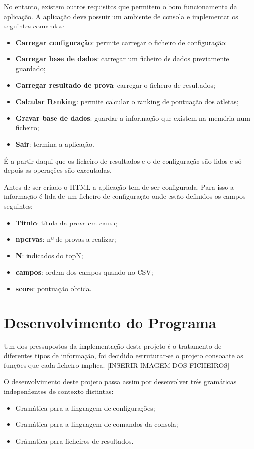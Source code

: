 \documentclass[11pt, a4paper, oneside]{article}
\begin{document}
No entanto, existem outros requisitos que permitem o bom funcionamento da aplicação. A aplicação deve possuir um ambiente de consola e implementar os seguintes comandos:
\begin{itemize}
\item \textbf{Carregar configuração}: permite carregar o ficheiro de configuração;
\item \textbf{Carregar base de dados}: carregar um ficheiro de dados previamente guardado;
\item \textbf{Carregar resultado de prova}: carregar o ficheiro de resultados;
\item \textbf{Calcular Ranking}: permite calcular o ranking de pontuação dos atletas;
\item \textbf{Gravar base de dados}: guardar a informação que existem na memória num ficheiro;
\item \textbf{Sair}: termina a aplicação.
\end{itemize}

É a partir daqui que os ficheiro de resultados e o de configuração são lidos e só depois as operações são executadas. 

Antes de ser criado o HTML a aplicação tem de ser configurada. Para isso a informação é lida de um ficheiro de configuração onde estão definidos os campos seguintes:
\begin{itemize}
\item \textbf{Titulo}: título da prova em causa;
\item \textbf{nporvas}: nº de provas a realizar;
\item \textbf{N}: indicados do topN;
\item \textbf{campos}: ordem dos campos quando no CSV;
\item \textbf{score}: pontuação obtida.
\end{itemize}

\newpage

\section{Desenvolvimento do Programa}
Um dos pressupostos da implementação deste projeto é o tratamento de diferentes tipos de informação, foi decidido estruturar-se o projeto consoante as funções que cada ficheiro implica.
[INSERIR IMAGEM DOS FICHEIROS]

O desenvolvimento deste projeto passa assim por desenvolver três gramáticas independentes de contexto distintas: 
\begin{itemize}
\item Gramática para a linguagem de configurações;
\item Gramática para a linguagem de comandos da consola; 
\item Grámatica para ficheiros de resultados. 
\end{itemize}
\end{document}
